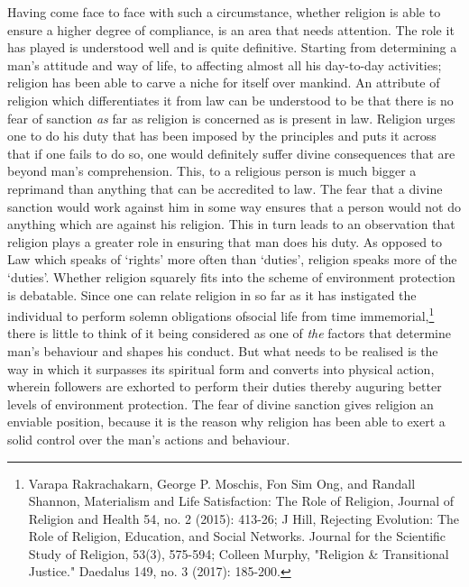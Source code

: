 \begin{multicols}{2}
\noi
Having come face to face with such a circumstance, whether religion is able to ensure a higher
degree of compliance, is an area that needs attention. The role it has played is understood well
and is quite definitive. Starting from determining a man’s attitude and way of life, to affecting
almost all his day-to-day activities; religion has been able to carve a niche for itself over
mankind. An attribute of religion which differentiates it from law can be understood to be that there is no fear of sanction \textit{as} far as religion is concerned as is present in law. Religion urges
one to do his duty that has been imposed by the principles and puts it across that if one fails to
do so, one would definitely suffer divine consequences that are beyond man’s comprehension.
This, to a religious person is much bigger a reprimand than anything that can be accredited to
law. The fear that a divine sanction would work against him in some way ensures that a person
would not do anything which are against his religion. This in turn leads to an observation that
religion plays a greater role in ensuring that man does his duty. As opposed to Law which
speaks of ‘rights’ more often than ‘duties’, religion speaks more of the ‘duties’. Whether
religion squarely fits into the scheme of environment protection is debatable. Since one can
relate religion in so far as it has instigated the individual to perform solemn obligations ofsocial
life from time immemorial,\footnote{Varapa Rakrachakarn, George P. Moschis, Fon Sim Ong, and Randall Shannon, Materialism and Life Satisfaction: The Role of Religion, Journal of Religion and Health 54, no. 2 (2015): 413-26; J Hill, Rejecting Evolution: The Role of Religion, Education, and Social Networks. Journal for the Scientific Study of Religion, 53(3), 575-594; Colleen Murphy, "Religion \& Transitional Justice." Daedalus 149, no. 3 (2017): 185-200.} there is little to think of it being considered as one of \textit{the} factors that determine man’s behaviour and shapes his conduct. But what needs to be realised is the way in which it surpasses its spiritual form and converts into physical action, wherein followers are exhorted to perform their duties thereby auguring better levels of environment protection.
The fear of divine sanction gives religion an enviable position, because it is the reason why
religion has been able to exert a solid control over the man’s actions and behaviour.



\end{multicols}
